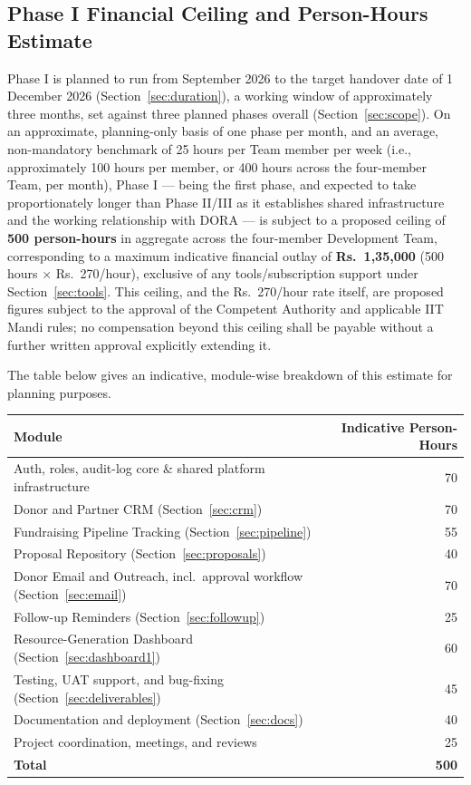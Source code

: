 \documentclass[11pt]{article}
\begin{document}
\subsection{Phase I Financial Ceiling and Person-Hours Estimate}
\label{sec:ceiling}
Phase I is planned to run from September 2026 to the target handover date of 1 December 2026 (Section~\ref{sec:duration}), a working window of approximately three months, set against three planned phases overall (Section~\ref{sec:scope}). On an approximate, planning-only basis of one phase per month, and an average, non-mandatory benchmark of 25 hours per Team member per week (i.e., approximately 100 hours per member, or 400 hours across the four-member Team, per month), Phase I --- being the first phase, and expected to take proportionately longer than Phase II/III as it establishes shared infrastructure and the working relationship with DORA --- is subject to a proposed ceiling of \textbf{500 person-hours} in aggregate across the four-member Development Team, corresponding to a maximum indicative financial outlay of \textbf{Rs.~1,35,000} (500 hours $\times$ Rs.~270/hour), exclusive of any tools/subscription support under Section~\ref{sec:tools}. This ceiling, and the Rs.~270/hour rate itself, are proposed figures subject to the approval of the Competent Authority and applicable IIT Mandi rules; no compensation beyond this ceiling shall be payable without a further written approval explicitly extending it.

The table below gives an indicative, module-wise breakdown of this estimate for planning purposes.

\begin{center}
\begin{tabular}{@{}p{9.5cm}r@{}}
\toprule
\textbf{Module} & \textbf{Indicative Person-Hours} \\
\midrule
Auth, roles, audit-log core \& shared platform infrastructure & 70 \\
Donor and Partner CRM (Section~\ref{sec:crm}) & 70 \\
Fundraising Pipeline Tracking (Section~\ref{sec:pipeline}) & 55 \\
Proposal Repository (Section~\ref{sec:proposals}) & 40 \\
Donor Email and Outreach, incl.\ approval workflow (Section~\ref{sec:email}) & 70 \\
Follow-up Reminders (Section~\ref{sec:followup}) & 25 \\
Resource-Generation Dashboard (Section~\ref{sec:dashboard1}) & 60 \\
Testing, UAT support, and bug-fixing (Section~\ref{sec:deliverables}) & 45 \\
Documentation and deployment (Section~\ref{sec:docs}) & 40 \\
Project coordination, meetings, and reviews & 25 \\
\midrule
\textbf{Total} & \textbf{500} \\
\bottomrule
\end{tabular}
\end{center}
\end{document}
